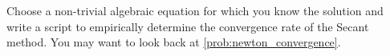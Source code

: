 \begin{problem}
    Choose a non-trivial algebraic equation for which you know the solution and write a
    script to empirically determine the convergence rate of the Secant method.  You may want to
    look back at \ref{prob:newton_convergence}.
\end{problem}


% 
% 
% 


